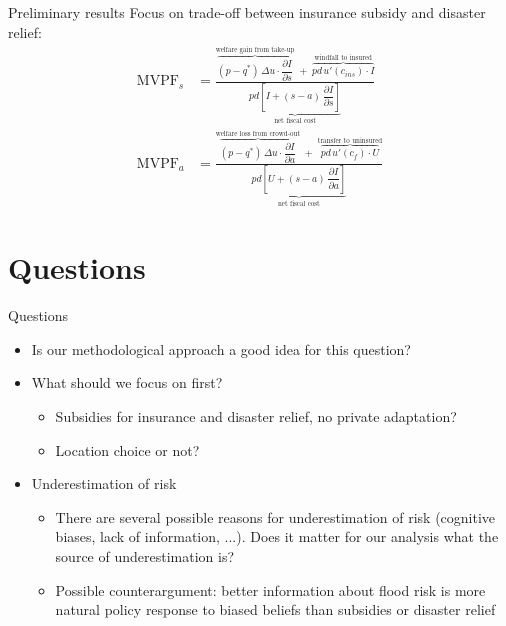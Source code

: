 \documentclass[xcolor=dvipsnames, aspectratio = 169]{beamer}
\begin{document}
{\begin{frame}{Preliminary results}
    Focus on trade-off between insurance subsidy and disaster relief:
    \begin{align}
    \text{MVPF}_s 
    &= \frac{
    \overbrace{(p-q^*)\,\Delta u \cdot \dfrac{\partial I}{\partial s}}^{\text{welfare gain from take-up}}
    \;+\;
    \overbrace{pd\,u'(c_{ins})\cdot I}^{\text{windfall to insured}}
    }{
    \underbrace{pd\!\left[I + (s-a)\,\dfrac{\partial I}{\partial s}\right]}_{\text{net fiscal cost}}
    }
    \label{eq:mvpf_s}
    \\[14pt]
    \text{MVPF}_a 
    &= \frac{
    \overbrace{(p-q^*)\,\Delta u \cdot \dfrac{\partial I}{\partial a}}^{\text{welfare loss from crowd-out}}
    \;+\;
    \overbrace{pd\,u'(c_f)\cdot U}^{\text{transfer to uninsured}}
    }{
    \underbrace{pd\!\left[U + (s-a)\,\dfrac{\partial I}{\partial a}\right]}_{\text{net fiscal cost}}
    }
    \label{eq:mvpf_a}
    \end{align}
    
\end{frame}

\section{Questions}

\begin{frame}{Questions}
  \begin{itemize}
    \item Is our methodological approach a good idea for this question?
    \item What should we focus on first?
    \begin{itemize}
      \item Subsidies for insurance and disaster relief, no private adaptation?
      \item Location choice or not?
    \end{itemize}
    \item Underestimation of risk
    \begin{itemize}
      \item There are several possible reasons for underestimation of risk (cognitive biases, lack of information, ...). Does it matter for our analysis what the source of underestimation is?
      \item Possible counterargument: better information about flood risk is more natural policy response to biased beliefs than subsidies or disaster relief
    \end{itemize}
  \end{itemize}
\end{frame}

}
\end{document}
